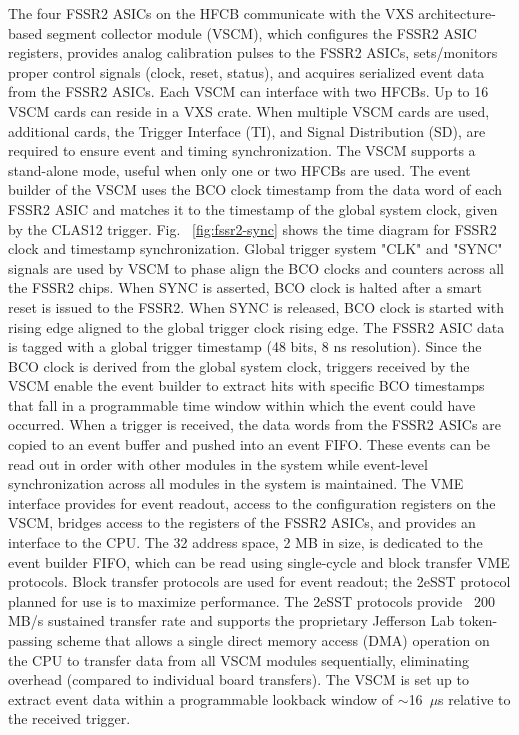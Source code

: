 The four FSSR2 ASICs on the HFCB communicate with the VXS architecture-based segment collector module (VSCM), which configures the FSSR2 ASIC registers, provides analog calibration pulses to the FSSR2 ASICs, sets/monitors proper control signals (clock, reset, status), and acquires serialized event data from the FSSR2 ASICs. Each VSCM can interface with two HFCBs. Up to 16 VSCM cards can reside in a VXS crate. When multiple VSCM cards are used, additional cards, the Trigger Interface (TI), and Signal Distribution (SD), are required to ensure event and timing synchronization. The VSCM supports a stand-alone mode, useful when only one or two HFCBs are used. The event builder of the VSCM uses the BCO clock timestamp from the data word of each FSSR2 ASIC and matches it to the timestamp of the global system clock, given by the CLAS12 trigger. Fig. ~\ref{fig:fssr2-sync} shows the time diagram for FSSR2 clock and timestamp synchronization. Global trigger system "CLK" and "SYNC" signals are used by VSCM to phase align the BCO clocks  and counters across all the FSSR2 chips. When SYNC is asserted, BCO clock is halted after a smart reset is issued to the FSSR2. When SYNC is released, BCO clock is started with rising edge aligned to the global trigger clock rising edge. The FSSR2 ASIC data is tagged with a global trigger timestamp (48 bits, 8 ns resolution). Since the BCO clock is derived from the global system clock, triggers received by the VSCM enable the event builder to extract hits with specific BCO timestamps that fall in a programmable time window within which the event could have occurred. When a trigger is received, the data words from the FSSR2 ASICs are copied to an event buffer and pushed into an event FIFO. These events can be read out in order with other modules in the system while event-level synchronization across all modules in the system is maintained. The VME interface provides for event readout, access to the configuration registers on the VSCM, bridges access to the registers of the FSSR2 ASICs, and provides an interface to the CPU. The 32 address space, 2 MB in size, is dedicated to the event builder FIFO, which can be read using single-cycle and block transfer VME protocols. Block transfer protocols are used for event readout; the 2eSST protocol planned for use is to maximize performance. The 2eSST protocols provide ~200 MB/s sustained transfer rate and supports the proprietary Jefferson Lab token-passing scheme that allows a single direct memory access (DMA) operation on the CPU to transfer data from all VSCM modules sequentially, eliminating overhead (compared to individual board transfers). The VSCM is set up to extract event data within a programmable lookback window of $\sim$16~$\mu$s relative to the received trigger. 


